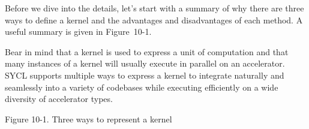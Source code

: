 Before we dive into the details, let’s start with a summary of why there are three ways to define a kernel and the advantages and disadvantages of each method. A useful summary is given in Figure 10-1.\par

Bear in mind that a kernel is used to express a unit of computation and that many instances of a kernel will usually execute in parallel on an accelerator. SYCL supports multiple ways to express a kernel to integrate naturally and seamlessly into a variety of codebases while executing efficiently on a wide diversity of accelerator types.\par

\hspace*{\fill} \par %
Figure 10-1. Three ways to represent a kernel
